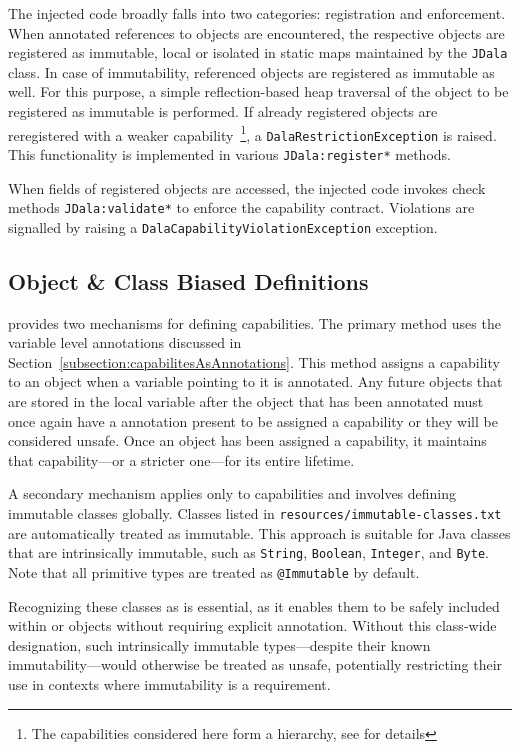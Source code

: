 The injected code broadly falls into two categories: registration and enforcement. When  annotated references to objects are encountered, the respective objects are registered as immutable, local or isolated in static maps maintained by the \texttt{JDala} class. In case of immutability, referenced objects are registered as immutable as well. For this purpose, a simple reflection-based  heap traversal of the object to be registered as immutable is performed.  If already registered objects are reregistered with a weaker capability~\footnote{The capabilities considered here form a hierarchy, see \cite{Dala_Paper} for details}, a \texttt{DalaRestrictionException} is raised.  This functionality is implemented in various \texttt{JDala:register*} methods.

When fields of registered objects are accessed, the injected code invokes check methods \texttt{JDala:validate*} to enforce the capability contract. Violations are signalled by raising a \texttt{DalaCapabilityViolationException} exception.




\subsection{Object \& Class Biased Definitions}


\jdala provides two mechanisms for defining capabilities. The primary method uses the variable level annotations discussed in Section~\ref{subsection:capabilitesAsAnnotations}. This method assigns a capability to an object when a variable pointing to it is annotated. Any future objects that are stored in the local variable after the object that has been annotated must once again have a annotation present to be assigned a capability or they will be considered unsafe.
Once an object has been assigned a capability, it maintains that capability—or a stricter one—for its entire lifetime.

A secondary mechanism applies only to \Immutable capabilities and involves defining immutable classes globally. Classes listed in \texttt{resources/immutable-classes.txt} are automatically treated as immutable. This approach is suitable for Java classes that are intrinsically immutable, such as \texttt{String}, \texttt{Boolean}, \texttt{Integer}, and \texttt{Byte}. Note that all primitive types are treated as \texttt{@Immutable} by default.

Recognizing these classes as \Immutable is essential, as it enables them to be safely included within \Local or \Isolated objects without requiring explicit annotation. Without this class-wide designation, such intrinsically immutable types—despite their known immutability—would otherwise be treated as unsafe, potentially restricting their use in contexts where immutability is a requirement.

